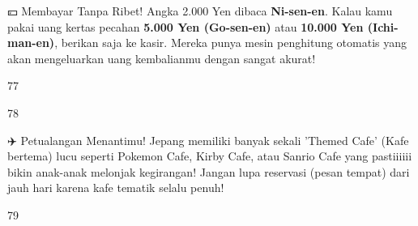 \begin{lessonbox}{💴 Membayar Tanpa Ribet!}
    Angka 2.000 Yen dibaca \textbf{Ni-sen-en}. Kalau kamu pakai uang kertas pecahan \textbf{5.000 Yen (Go-sen-en)} atau \textbf{10.000 Yen (Ichi-man-en)}, berikan saja ke kasir. Mereka punya mesin penghitung otomatis yang akan mengeluarkan uang kembalianmu dengan sangat akurat! 
\end{lessonbox}

\begin{convobox}{77}
    \noindent

    \vspace{1.5em}
\end{convobox}

\begin{convobox}{78}
    \noindent
       

    \vspace{1.5em}
\end{convobox}

\begin{lessonbox}{✈️ Petualangan Menantimu!}
    Jepang memiliki banyak sekali 'Themed Cafe' (Kafe bertema) lucu seperti Pokemon Cafe, Kirby Cafe, atau Sanrio Cafe yang pastiiiiii bikin anak-anak melonjak kegirangan! Jangan lupa reservasi (pesan tempat) dari jauh hari karena kafe tematik selalu penuh!
\end{lessonbox}

\begin{convobox}{79}
    \noindent
       
     

    \vspace{1.5em}
\end{convobox}

